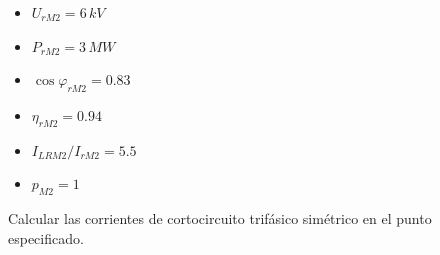             \begin{minipage}{0.2\textwidth}
                \begin{itemize}
                    \item $U_\textit{rM2} = 6\,\textit{kV}$
                    \item $P_\textit{rM2} = 3\,\textit{MW}$
                    \item $\cos\varphi_\textit{rM2} = 0.83$
                    \item $\eta_\textit{rM2} = 0.94$
                    \item $I_\textit{LRM2}/I_\textit{rM2} = 5.5$
                    \item $p_\textit{M2} = 1$
                \end{itemize}
            \end{minipage}

            \vspace{2mm}
            Calcular las corrientes de cortocircuito trifásico simétrico en el punto especificado.

